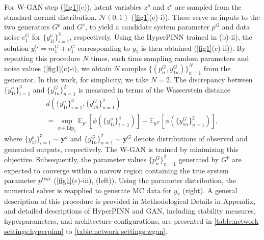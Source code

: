 \documentclass[letterpaper]{article} %
\theoremstyle{thmstyleone}%
\theoremstyle{thmstyletwo}%
\theoremstyle{thmstylethree}%
\begin{document}
For W-GAN step (\cref{fig1}(c)), latent variables $z^p$ and $z^e$ are sampled from the standard normal distribution, $\mathcal{N}(0, 1)$ (\cref{fig1}(c)-i)). These serve as inputs to the two generators $G^p$ and $G^e$, to yield a candidate system parameter $p^G$ and data noise $e_{1}^G$ for $\{y_{1i}^{o}\}_{i=1}^{3}$, respectively. Using the HyperPINN trained in (b)-ii), the solution $y_{1}^G=m_{1}^G+e_1^G$ corresponding to $y_{1}$ is then obtained (\cref{fig1}(c)-ii)). By repeating this procedure $N$ times, each time sampling random parameters and noise values (\cref{fig1}(c)-i), we obtain $N$ samples $\{(p_{n}^{G},y_{1n}^{G})\}_{n=1}^{N}$ from the generator. In this work, for simplicity, we take $N=2$. The discrepancy between $\{y_{1i}^o\}_{i=1}^{3}$ and $\{y_{1n}^{G}\}_{n=1}^{2}$ is measured in terms of the Wasserstein distance \begin{gather*} d(\{y_{1i}^o\}_{i=1}^{3},\{y_{1n}^{G}\}_{n=1}^{2}) \\ = 
 \sup_{\phi \in \text{Lip}_{1}}\mathbb{E}_{\mathbf{y}^o}[\phi(\{y_{1i}^o\}_{i=1}^3)]-\mathbb{E}_{\mathbf{y}^G}[\phi(\{y_{1n}^{G}\}_{n=1}^{2})], \end{gather*} where $\{y_{1i}^o\}_{i=1}^3\sim\mathbf{y}^o$ and $\{y_{1n}^{G}\}_{n=1}^{2}\sim\mathbf{y}^G$ denote distributions of observed and generated outputs, respectively. The W-GAN is trained by minimizing this objective. Subsequently, the parameter values $\{p_{n}^G\}_{n=1}^{2}$ generated by $G^p$ are expected to converge within a narrow region containing the true system parameter $p^{true}$ (\cref{fig1}(c)-iii), (left)). Using the parameter distribution, the numerical solver is reapplied to generate MC data for $y_2$ (right). A general description of this procedure is provided in Methodological Details in Appendix, and detailed descriptions of HyperPINN and GAN, including stability measures, hyperparameters, and architecture configurations, are presented in \cref{table:network settings:hyperpinn} to \cref{table:network settings:wgan}.
\end{document}

